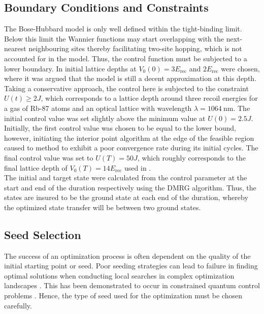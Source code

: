 \subsection{Boundary Conditions and Constraints}
The Bose-Hubbard model is only well defined within the tight-binding limit. Below this limit the Wannier functions may start overlapping with the next-nearest neighbouring sites thereby facilitating two-site hopping, which is not accounted for in the model. Thus, the control function must be subjected to a lower boundary. In \cite{FrankBloch,Doria2011} initial lattice depths at $V_0 (0) = 3 E_{\mathrm{rec}}$ and $2 E_{\mathrm{rec}}$ were chosen, where it was argued that the model is still a decent approximation at this depth.
Taking a conservative approach, the control here is subjected to the constraint $U (t) \geq 2 J$, which corresponds to a lattice depth around three recoil energies for a gas of Rb-87 atoms and an optical lattice with wavelength $\lambda = 1064 \: \mathrm{nm}$. 
The initial control value was set slightly above the minimum value at $U (0) = 2.5 J$. Initially, the first control value was chosen to be equal to the lower bound, however, initiating the interior point algorithm at the edge of the feasible region caused to method to exhibit a poor convergence rate during its initial cycles.
The final control value was set to $U (T) = 50 J$, which roughly corresponds to the final lattice depth of $V_0 (T) = 14 E_{\mathrm{rec}}$ used in \cite{FrankBloch}.\\
The initial and target state were calculated from the control parameter at the start and end of the duration respectively using the DMRG algorithm. Thus, the states are insured to be the ground state at each end of the duration, whereby the optimized state transfer will be between two ground states.


\subsection{Seed Selection}
The success of an optimization process is often dependent on the quality of the initial starting point or seed. Poor seeding strategies can lead to failure in finding optimal solutions when conducting local searches in complex optimization landscapes \cite{Sorensen2016}. This has been demonstrated to occur in constrained quantum control problems \cite{Zhdanov2015}. Hence, the type of seed used for the optimization must be chosen carefully.

